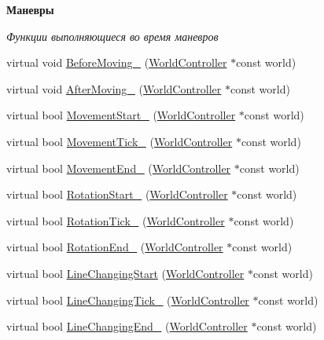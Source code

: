 \begin{Indent}\textbf{ Маневры}\par
{\em Функции выполняющиеся во время маневров }\begin{DoxyCompactItemize}
\item 
virtual void \hyperlink{classrtm_1_1_vehicle_object_abac2e84c7d102e9170843efd80c53fd2}{Before\+Moving\+\_\+} (\hyperlink{classrtm_1_1_world_controller}{World\+Controller} $\ast$const world)
\item 
virtual void \hyperlink{classrtm_1_1_vehicle_object_a4ffe184361efac31e9a009cfc4e07a1b}{After\+Moving\+\_\+} (\hyperlink{classrtm_1_1_world_controller}{World\+Controller} $\ast$const world)
\item 
virtual bool \hyperlink{classrtm_1_1_vehicle_object_aa02e0b8f3fa159939f370938e45abf88}{Movement\+Start\+\_\+} (\hyperlink{classrtm_1_1_world_controller}{World\+Controller} $\ast$const world)
\item 
virtual bool \hyperlink{classrtm_1_1_vehicle_object_a06a920b3fe0df4fa4ca0687a9366426a}{Movement\+Tick\+\_\+} (\hyperlink{classrtm_1_1_world_controller}{World\+Controller} $\ast$const world)
\item 
virtual bool \hyperlink{classrtm_1_1_vehicle_object_a7e6c94902d1d544006ca8de63ba36860}{Movement\+End\+\_\+} (\hyperlink{classrtm_1_1_world_controller}{World\+Controller} $\ast$const world)
\item 
virtual bool \hyperlink{classrtm_1_1_vehicle_object_a2c449bdf4d8e954fe7bd06de4b64deb7}{Rotation\+Start\+\_\+} (\hyperlink{classrtm_1_1_world_controller}{World\+Controller} $\ast$const world)
\item 
virtual bool \hyperlink{classrtm_1_1_vehicle_object_a3dd8736f34c5e5ba26259335193628e5}{Rotation\+Tick\+\_\+} (\hyperlink{classrtm_1_1_world_controller}{World\+Controller} $\ast$const world)
\item 
virtual bool \hyperlink{classrtm_1_1_vehicle_object_ab109b98ab7bda9402a6197efa98e5a03}{Rotation\+End\+\_\+} (\hyperlink{classrtm_1_1_world_controller}{World\+Controller} $\ast$const world)
\item 
virtual bool \hyperlink{classrtm_1_1_vehicle_object_a8976be533dfa4704f7b221c79d1fce99}{Line\+Changing\+Start} (\hyperlink{classrtm_1_1_world_controller}{World\+Controller} $\ast$const world)
\item 
virtual bool \hyperlink{classrtm_1_1_vehicle_object_ad14f2e164f2105fbae0c982cec4aff9a}{Line\+Changing\+Tick\+\_\+} (\hyperlink{classrtm_1_1_world_controller}{World\+Controller} $\ast$const world)
\item 
virtual bool \hyperlink{classrtm_1_1_vehicle_object_a61c3ec3ea6a03c4c031c2b72def10c72}{Line\+Changing\+End\+\_\+} (\hyperlink{classrtm_1_1_world_controller}{World\+Controller} $\ast$const world)
\end{DoxyCompactItemize}
\end{Indent}
